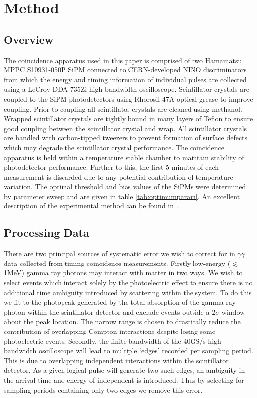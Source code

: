 \section{Method}
\subsection{Overview}
The coincidence apparatus used in this paper is comprised of two Hamamatsu MPPC S10931-050P SiPM connected to CERN-developed NINO discriminators from which the energy and timing information of individual pulses are collected using a LeCroy DDA 735Zi high-bandwidth oscilloscope. Scintillator crystals are coupled to the SiPM photodetectors using Rhorosil 47A optical grease to improve coupling. Prior to coupling all scintillator crystals are cleaned using methanol. Wrapped scintillator crystals are tightly bound in many layers of Teflon to ensure good coupling between the scintillator crystal and wrap. All scintillator crystals are handled with carbon-tipped tweezers to prevent formation of surface defects which may degrade the scintillator crystal performance. The coincidence apparatus is held within a temperature stable chamber to maintain stability of photodetector performance. Further to this, the first 5 minutes of each measurement is discarded due to any potential contribution of temperature variation. The optimal threshold and bias values of the SiPMs were determined by parameter sweep and are given in table \ref{tab:optimumparam}. An excellent description of the experimental method can be found in \cite{ch_Meyer_Pizzichemi_Lecoq_2013}.

\subsection{Processing Data}
There are two principal sources of systematic error we wish to correct for in $\gamma\gamma$ data collected from timing coincidence measurements. Firstly low-energy ($\lesssim$1MeV) gamma ray photons may interact with matter in two ways. We wish to select events which interact solely by the photoelectric effect to ensure there is no additional time ambiguity introduced by scattering within the system. To do this we fit to the photopeak generated by the total absorption of the gamma ray photon within the scintillator detector and exclude events outside a $2\sigma$ window about the peak location. The narrow range is chosen to drastically reduce the contribution of overlapping Compton interactions despite losing some photoelectric events. Secondly, the finite bandwidth of the 40GS/s high-bandwidth oscilloscope will lead to multiple `edges' recorded per sampling period. This is due to overlapping independent interactions within the scintillator detector. As a given logical pulse will generate two such edges, an ambiguity in the arrival time and energy of independent is introduced. Thus by selecting for sampling periods containing only two edges we remove this error. 

